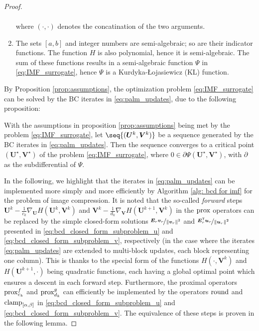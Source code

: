 \begin{proof}
\begin{prop}
\begin{enumerate}
\begin{align}
            \end{align}
            where $(\cdot,\cdot)$ denotes the concatination of the two arguments.
            \item The sets $[a,b]$ and integer numbers are semi-algebraic; so are their indicator functions. The function $H$ is also polynomial, hence it is semi-algebraic. The sum of these functions results in a semi-algebraic function $\Psi$ in \eqref{eq:IMF_surrogate}, hence $\Psi$ is a Kurdyka-Łojasiewicz (KL) function.
        \end{enumerate}
    \end{prop}
    By Proposition \ref{prop:assumptions}, the optimization problem \eqref{eq:IMF_surrogate} can be solved by the BC iterates in \eqref{eq:palm_updates}, due to the following proposition:
    \begin{prop}\label{prop:convergence}
        With the assumptions in proposition \ref{prop:assumptions} being met by the problem \eqref{eq:IMF_surrogate}, let $\seq{(\bm U^k, \bm V^k)}$ be a sequence generated by the BC iterates in \eqref{eq:palm_updates}. Then the sequence converges to a critical point $(\bm U^\star, \bm V^\star)$ of the problem \eqref{eq:IMF_surrogate}, where $0 \in \partial \Psi(\bm U^\star, \bm V^\star)$, with $\partial$ as the subdifferential of $\Psi$.
    \end{prop}

    In the following, we highlight that the iterates in \eqref{eq:palm_updates} can be implemented more simply and more efficiently by Algorithm \ref{alg: bcd for imf} for the problem of image compression. It is noted that the so-called \emph{forward} steps $\bm U^k - \frac{1}{c_k} \nabla_{\bm U} H(\bm U^k, \bm V^k)$ and $\bm V^k - \frac{1}{d_k} \nabla_{\bm V} H(\bm U^{k+1}, \bm V^k)$ in the $\operatorname{prox}$ operators can be replaced by the simple closed-form solutions $\nicefrac{\bm{E}_r \bm{v}_r}{\lVert \bm{v}_r \rVert^2}$ and $\nicefrac{\bm{E}_r^\mathsf{T} \bm{u}_r}{\lVert \bm{u}_r \rVert^2}$ presented in \eqref{eq:bcd_closed_form_subproblem_u} and \eqref{eq:bcd_closed_form_subproblem_v}, respectively (in the case where the iterates \eqref{eq:palm_updates} are extended to multi-block updates, each block representing one column). This is thanks to the special form of the functions $H(\cdot, \bm V^k)$ and $H(\bm U^{k+1}, \cdot)$ being quadratic functions, each having a global optimal point which ensures a descent in each forward step. 
    Furthermore, the proximal operators $\operatorname{prox}^f_{c_k}$ and $\operatorname{prox}^g_{d_k}$ can efficiently be implemented by the operators $\operatorname{round}$ and $\operatorname{clamp}_{[\alpha,\beta]}$ in \eqref{eq:bcd_closed_form_subproblem_u} and \eqref{eq:bcd_closed_form_subproblem_v}. The equivalence of these steps is proven in the following lemma.


\end{proof}

